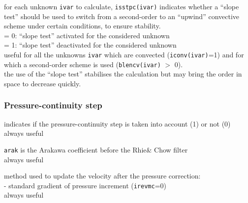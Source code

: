 {for each unknown {\tt ivar} to calculate, {\tt isstpc(ivar)}
indicates whether a ``slope test'' should
be used to switch from a second-order to an ``upwind'' convective
scheme under certain conditions, to ensure stability.\\
\hspace*{1.3cm}= 0: ``slope test'' activated for the considered unknown\\
\hspace*{1.3cm}= 1: ``slope test'' deactivated for the considered unknown\\
useful for all the unknowns {\tt ivar}  which are convected
({\tt iconv(ivar)}=1) and
for which a second-order scheme is used ({\tt blencv(ivar)} $>$ 0).\\
the use of the ``slope test'' stabilises the calculation but may bring
the order in space to decrease quickly.}

\subsubsection{Pressure-continuity step}

{indicates if the pressure-continuity step is taken into account (1) or
not (0)\\
always useful}

{{\tt arak} is the Arakawa coefficient before the
Rhie\& Chow filter\\
always useful}

{method used to update the velocity after the pressure
correction:\\
\hspace*{0,5cm}- standard gradient of pressure increment
({\tt irevmc}=0)\\
always useful}

